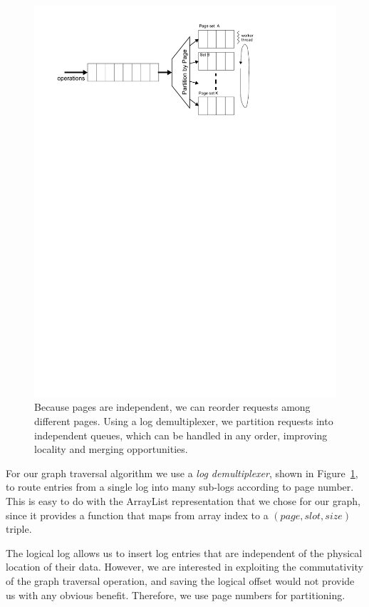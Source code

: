 \documentclass[10pt,letterpaper,twocolumn,english]{article}
\begin{document}
\begin{figure}
\includegraphics[width=1\columnwidth]{graph-traversal.pdf}
\vspace{-24pt}
\caption{\sf\label{fig:multiplexor} Because pages are independent, we
can reorder requests among different pages. Using a log demultiplexer,
we partition requests into independent queues, which can be 
handled in any order, improving locality and merging opportunities.}
\end{figure}

For our graph traversal algorithm we use a {\em log demultiplexer},
shown in Figure~\ref{fig:multiplexor}, to route entries from a single
log into many sub-logs according to page number.  This is easy to do
with the ArrayList representation that we chose for our graph, since
it provides a function that maps from
array index to a $(page, slot, size)$ triple.

The logical log allows us to insert log entries that are independent
of the physical location of their data.  However, we are
interested in exploiting the commutativity of the graph traversal
operation, and saving the logical offset would not provide us with any
obvious benefit.  Therefore, we use page numbers for partitioning.
\end{document}
